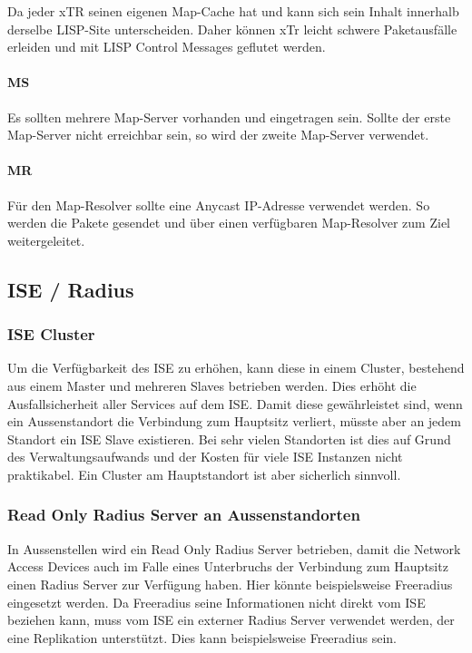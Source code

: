 Da jeder xTR seinen eigenen Map-Cache hat und kann sich sein Inhalt innerhalb derselbe LISP-Site unterscheiden. Daher können xTr leicht schwere Paketausfälle erleiden und mit LISP Control Messages geflutet werden.  

\paragraph{MS}
Es sollten mehrere Map-Server vorhanden und eingetragen sein. Sollte der erste Map-Server nicht erreichbar sein, so wird der zweite Map-Server verwendet.

\paragraph{MR}
Für den Map-Resolver sollte eine Anycast IP-Adresse verwendet werden. So werden die Pakete gesendet und über einen verfügbaren Map-Resolver zum Ziel weitergeleitet.

\subsection{ISE / Radius}

\subsubsection{ISE Cluster}

Um die Verfügbarkeit des ISE zu erhöhen, kann diese in einem Cluster, bestehend aus einem Master und mehreren Slaves betrieben werden. Dies erhöht die Ausfallsicherheit aller Services auf dem ISE. Damit diese gewährleistet sind, wenn ein Aussenstandort die Verbindung zum Hauptsitz verliert, müsste aber an jedem Standort ein ISE Slave existieren. Bei sehr vielen Standorten ist dies auf Grund des Verwaltungsaufwands und der Kosten für viele ISE Instanzen nicht praktikabel. Ein Cluster am Hauptstandort ist aber sicherlich sinnvoll.

\subsubsection{Read Only Radius Server an Aussenstandorten}

In Aussenstellen wird ein Read Only Radius Server betrieben, damit die Network Access Devices auch im Falle eines Unterbruchs der Verbindung zum Hauptsitz einen Radius Server zur Verfügung haben. Hier könnte beispielsweise Freeradius eingesetzt werden. Da Freeradius seine Informationen nicht direkt vom ISE beziehen kann, muss vom ISE ein externer Radius Server verwendet werden, der eine Replikation unterstützt. Dies kann beispielsweise Freeradius sein.

